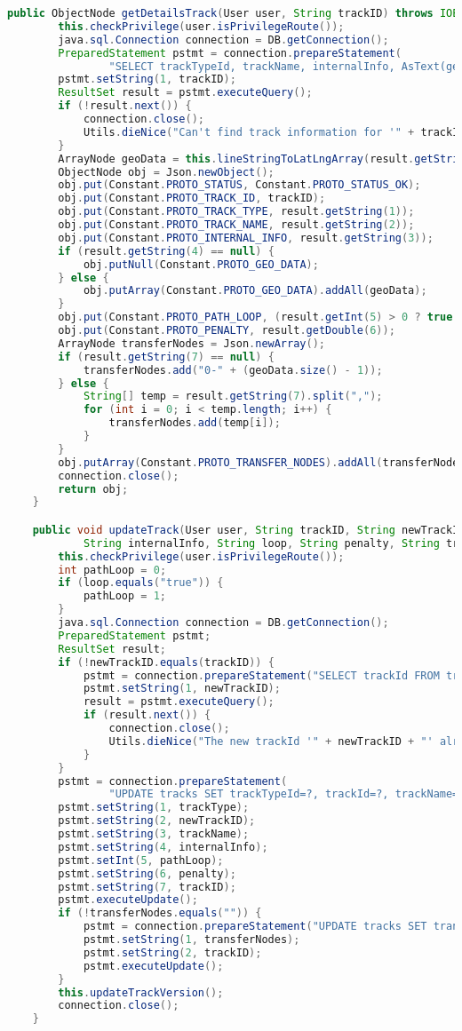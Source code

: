 \begin{lstlisting}[language=Java,basicstyle=\tiny,caption=models/TracksManager.java,label={lst:tracksmanager.java}]
	public ObjectNode getDetailsTrack(User user, String trackID) throws IOException, SQLException {
		this.checkPrivilege(user.isPrivilegeRoute());
		java.sql.Connection connection = DB.getConnection();
		PreparedStatement pstmt = connection.prepareStatement(
				"SELECT trackTypeId, trackName, internalInfo, AsText(geodata), pathloop, penalty, transferNodes FROM tracks WHERE trackId=?");
		pstmt.setString(1, trackID);
		ResultSet result = pstmt.executeQuery();
		if (!result.next()) {
			connection.close();
			Utils.dieNice("Can't find track information for '" + trackID + "'");
		}
		ArrayNode geoData = this.lineStringToLatLngArray(result.getString(4));
		ObjectNode obj = Json.newObject();
		obj.put(Constant.PROTO_STATUS, Constant.PROTO_STATUS_OK);
		obj.put(Constant.PROTO_TRACK_ID, trackID);
		obj.put(Constant.PROTO_TRACK_TYPE, result.getString(1));
		obj.put(Constant.PROTO_TRACK_NAME, result.getString(2));
		obj.put(Constant.PROTO_INTERNAL_INFO, result.getString(3));
		if (result.getString(4) == null) {
			obj.putNull(Constant.PROTO_GEO_DATA);
		} else {
			obj.putArray(Constant.PROTO_GEO_DATA).addAll(geoData);
		}
		obj.put(Constant.PROTO_PATH_LOOP, (result.getInt(5) > 0 ? true : false));
		obj.put(Constant.PROTO_PENALTY, result.getDouble(6));
		ArrayNode transferNodes = Json.newArray();
		if (result.getString(7) == null) {
			transferNodes.add("0-" + (geoData.size() - 1));
		} else {
			String[] temp = result.getString(7).split(",");
			for (int i = 0; i < temp.length; i++) {
				transferNodes.add(temp[i]);
			}
		}
		obj.putArray(Constant.PROTO_TRANSFER_NODES).addAll(transferNodes);
		connection.close();
		return obj;
	}

	public void updateTrack(User user, String trackID, String newTrackID, String trackType, String trackName,
			String internalInfo, String loop, String penalty, String transferNodes) throws SQLException, IOException {
		this.checkPrivilege(user.isPrivilegeRoute());
		int pathLoop = 0;
		if (loop.equals("true")) {
			pathLoop = 1;
		}
		java.sql.Connection connection = DB.getConnection();
		PreparedStatement pstmt;
		ResultSet result;
		if (!newTrackID.equals(trackID)) {
			pstmt = connection.prepareStatement("SELECT trackId FROM tracks WHERE trackId=?");
			pstmt.setString(1, newTrackID);
			result = pstmt.executeQuery();
			if (result.next()) {
				connection.close();
				Utils.dieNice("The new trackId '" + newTrackID + "' already existed.");
			}
		}
		pstmt = connection.prepareStatement(
				"UPDATE tracks SET trackTypeId=?, trackId=?, trackName=?, internalInfo=?, pathloop=?, penalty=? WHERE trackId=?");
		pstmt.setString(1, trackType);
		pstmt.setString(2, newTrackID);
		pstmt.setString(3, trackName);
		pstmt.setString(4, internalInfo);
		pstmt.setInt(5, pathLoop);
		pstmt.setString(6, penalty);
		pstmt.setString(7, trackID);
		pstmt.executeUpdate();
		if (!transferNodes.equals("")) {
			pstmt = connection.prepareStatement("UPDATE tracks SET transferNodes=? WHERE trackId=?");
			pstmt.setString(1, transferNodes);
			pstmt.setString(2, trackID);
			pstmt.executeUpdate();
		}
		this.updateTrackVersion();
		connection.close();
	}


\end{lstlisting}
